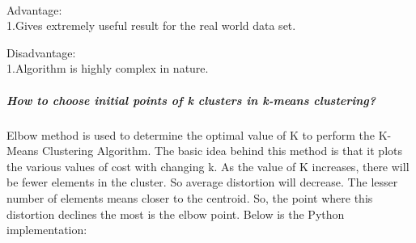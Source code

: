 \documentclass[11pt]{article}
\begin{document}
    \begin{center}
    \end{center}
    { \hspace*{\fill} \\}
    
    Advantage:\\
1.Gives extremely useful result for the real world data set.

Disadvantage:\\
1.Algorithm is highly complex in nature.

    \hypertarget{how-to-choose-initial-points-of-k-clusters-in-k-means-clustering}{%
\subparagraph{How to choose initial points of k clusters in k-means
clustering?}\label{how-to-choose-initial-points-of-k-clusters-in-k-means-clustering}}

    Elbow method is used to determine the optimal value of K to perform the
K-Means Clustering Algorithm. The basic idea behind this method is that
it plots the various values of cost with changing k. As the value of K
increases, there will be fewer elements in the cluster. So average
distortion will decrease. The lesser number of elements means closer to
the centroid. So, the point where this distortion declines the most is
the elbow point. Below is the Python implementation:
\end{document}
